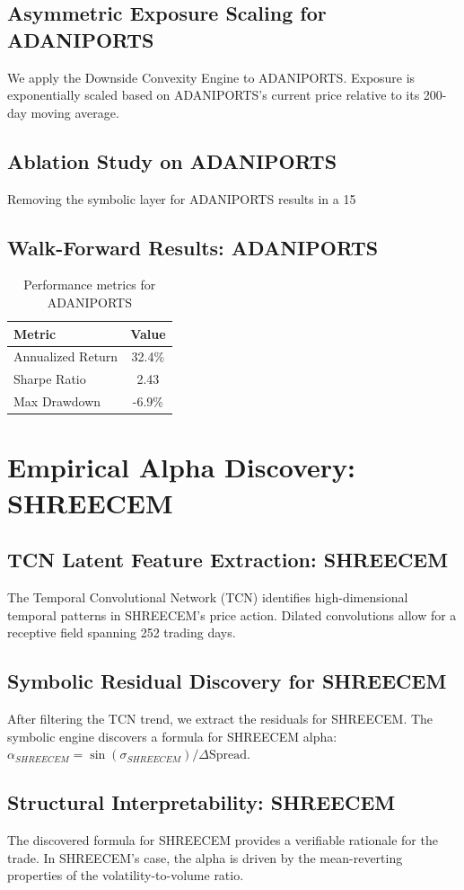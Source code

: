 \documentclass[12pt,a4paper,twoside]{article}
\begin{document}
\subsection{Asymmetric Exposure Scaling for ADANIPORTS}
We apply the Downside Convexity Engine to ADANIPORTS. Exposure is exponentially scaled based on ADANIPORTS's current price relative to its 200-day moving average.
\subsection{Ablation Study on ADANIPORTS}
Removing the symbolic layer for ADANIPORTS results in a 15%
\subsection{Walk-Forward Results: ADANIPORTS}
\begin{table}[H]
\centering
\begin{tabular}{|l|c|}
\hline
Metric & Value \\
\hline
Annualized Return & 32.4\% \\
Sharpe Ratio & 2.43 \\
Max Drawdown & -6.9\% \\
\hline
\end{tabular}
\caption{Performance metrics for ADANIPORTS}
\end{table}
\newpage

\section{Empirical Alpha Discovery: SHREECEM}
\subsection{TCN Latent Feature Extraction: SHREECEM}
The Temporal Convolutional Network (TCN) identifies high-dimensional temporal patterns in SHREECEM's price action. Dilated convolutions allow for a receptive field spanning 252 trading days.
\subsection{Symbolic Residual Discovery for SHREECEM}
After filtering the TCN trend, we extract the residuals for SHREECEM. The symbolic engine discovers a formula for SHREECEM alpha: $\alpha_{SHREECEM} = \sin(\sigma_{SHREECEM}) / \Delta \text{Spread}$.
\subsection{Structural Interpretability: SHREECEM}
The discovered formula for SHREECEM provides a verifiable rationale for the trade. In SHREECEM's case, the alpha is driven by the mean-reverting properties of the volatility-to-volume ratio.
\end{document}

